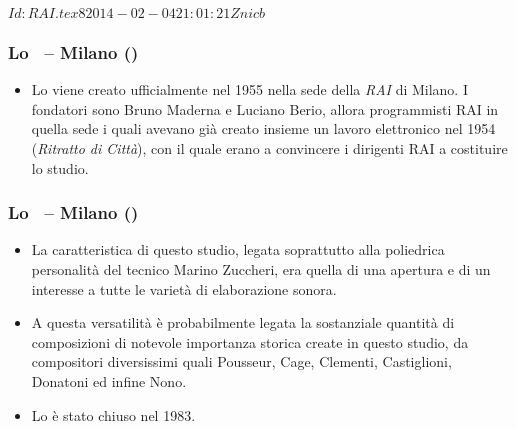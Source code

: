%
%
\svnInfo $Id: RAI.tex 8 2014-02-04 21:01:21Z nicb $

\setcounter{ms}{0}
\begin{frame}
    \frametitle{Lo \sfm\ -- Milano ()}

    \begin{itemize}

        \item Lo \sfm viene creato ufficialmente nel 1955 nella sede della \emph{RAI} di Milano.
            I fondatori sono Bruno Maderna e Luciano Berio,
            allora programmisti RAI in quella sede
            i quali avevano gi\`a creato insieme un lavoro elettronico nel 1954
            (\emph{Ritratto di Citt\`a}), con il quale erano a convincere i dirigenti
            RAI a costituire lo studio.

    \end{itemize}

\end{frame}

\begin{frame}
    \frametitle{Lo \sfm\ -- Milano ()}

    \begin{itemize}

        \item La caratteristica di questo studio, legata soprattutto alla poliedrica personalit\`a
            del tecnico Marino Zuccheri, era quella di una apertura e di un interesse
            a tutte le variet\`a di elaborazione sonora.

        \item A questa versatilit\`a \`e probabilmente legata
            la sostanziale quantit\`a di composizioni di notevole importanza storica
            create in questo studio, da compositori diversissimi quali
						Pousseur,
						Cage,
						Clementi,
						Castiglioni,
						Donatoni
						ed infine
						Nono.

        \item Lo \sfm \`e stato chiuso nel 1983.

    \end{itemize}

\end{frame}

